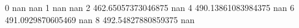 0 nan nan
1 nan nan
2 462.65057373046875 nan
4 490.13861083984375 nan
6 491.0929870605469 nan
8 492.54827880859375 nan
